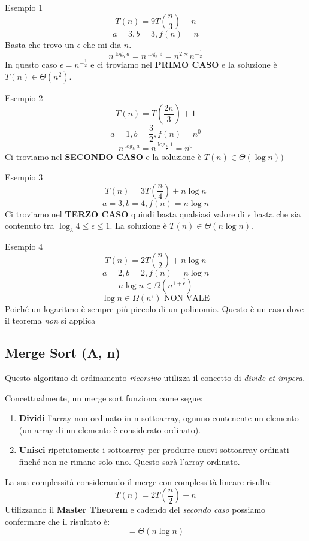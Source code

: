 \documentclass[a4paper]{article}
\begin{document}
\begin{examplebox}{Esempio 1}
    \[T(n) = 9T\left(\frac{n}{3}\right) + n\]
    \[a = 3, b = 3, f(n) = n\]
    Basta che trovo un $\epsilon$ che mi dia $n$.
    \[n^{\log_b a} = n^{\log_3 9} = n^2 * n^{-\frac{1}{2}}\]
    In questo caso $\epsilon = n^{-\frac{1}{2}}$ e ci troviamo nel \textbf{PRIMO CASO} e la soluzione è $T(n) \in \Theta(n^2)$.
\end{examplebox}

\begin{examplebox}{Esempio 2}
       \[T(n) = T\left(\frac{2n}{3}\right) + 1\]
    \[a = 1, b = \frac{3}{2}, f(n) = n^0\]
    \[n^{\log_b a} = n^{\log_{\frac{3}{2}} 1} = n^0\]
    Ci troviamo nel \textbf{SECONDO CASO} e la soluzione è $T(n) \in \Theta(\log n))$
\end{examplebox}

\begin{examplebox}{Esempio 3}
    \[T(n) = 3T\left(\frac{n}{4}\right) + n \log n\]
       \[a = 3, b = 4, f(n) = n \log n\]
       Ci troviamo nel \textbf{TERZO CASO} quindi basta qualsiasi valore di $\epsilon$ basta che sia contenuto tra $\log_3 4 \le \epsilon \le 1$. La soluzione è $T(n) \in \Theta(n\log n)$.
\end{examplebox}

\begin{examplebox}{Esempio 4}
    \[T(n) = 2T\left(\frac{n}{2}\right) + n \log n\]
       \[a = 2, b = 2, f(n) = n \log n\]
    \[n\log n \in \Omega(n^{1 + \stackrel{?}{\epsilon}}) \]
    \[\log n \in \Omega(n^\epsilon) \text{ NON VALE}\]
    Poiché un logaritmo è sempre più piccolo di un polinomio.
    Questo è un caso dove il teorema \textit{non} si applica
\end{examplebox}


\subsection{Merge Sort (A, n)}

Questo algoritmo di ordinamento \textit{ricorsivo} utilizza il concetto di \textit{divide et impera}.

Concettualmente, un merge sort funziona come segue:

\begin{enumerate}
    \item \textbf{Dividi} l'array non ordinato in n sottoarray, ognuno contenente un elemento (un array di un elemento è considerato ordinato).
    \item \textbf{Unisci} ripetutamente i sottoarray per produrre nuovi sottoarray ordinati finché non ne rimane solo uno. Questo sarà l'array ordinato.
\end{enumerate}
La sua complessità considerando il merge con complessità lineare risulta:
\[T(n) = 2T\left(\frac{n}{2}\right) + n\]
Utilizzando il \textbf{Master Theorem} e cadendo del \textit{secondo caso} possiamo confermare che il risultato è:
\[= \Theta(n \log n)\]
\end{document}
